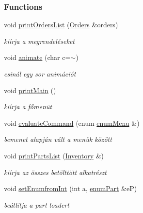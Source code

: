 \subsubsection*{Functions}
\begin{DoxyCompactItemize}
\item 
void \mbox{\hyperlink{_menu_8h_a2279d427508487e2c7194ba68588445d}{print\+Orders\+List}} (\mbox{\hyperlink{class_orders}{Orders}} \&orders)
\begin{DoxyCompactList}\small\item\em kiírja a megrendeléseket \end{DoxyCompactList}\item 
void \mbox{\hyperlink{_menu_8h_af1da99ec7d9dd6a0836bab3d808ee793}{animate}} (char c=\textquotesingle{}$\sim$\textquotesingle{})
\begin{DoxyCompactList}\small\item\em csinál egy sor animációt \end{DoxyCompactList}\item 
void \mbox{\hyperlink{_menu_8h_aa8348016f7273e63d47917126e8f9c69}{print\+Main}} ()
\begin{DoxyCompactList}\small\item\em kiírja a főmenüt \end{DoxyCompactList}\item 
void \mbox{\hyperlink{_menu_8h_aed630b39565f9b935d3148b396fd862d}{evaluate\+Command}} (enum \mbox{\hyperlink{_menu_8h_adbc27074b7dcd54cd4578936c6329d02}{enum\+Menu}} \&)
\begin{DoxyCompactList}\small\item\em bemenet alapján vált a menük között \end{DoxyCompactList}\item 
void \mbox{\hyperlink{_menu_8h_a54c74422af05849f9d508c0a5ccd468b}{print\+Parts\+List}} (\mbox{\hyperlink{class_inventory}{Inventory}} \&)
\begin{DoxyCompactList}\small\item\em kiírja az összes betölttött alkatrészt \end{DoxyCompactList}\item 
void \mbox{\hyperlink{_menu_8h_a4b1c8fae94d189d0d74b10cde7b75176}{set\+Enumfrom\+Int}} (int a, \mbox{\hyperlink{_parts_8h_abddff37837f171d72a2e16a1448a3943}{enum\+Part}} \&eP)
\begin{DoxyCompactList}\small\item\em beállítja a part loadert \end{DoxyCompactList}\item 

\end{DoxyCompactItemize}
